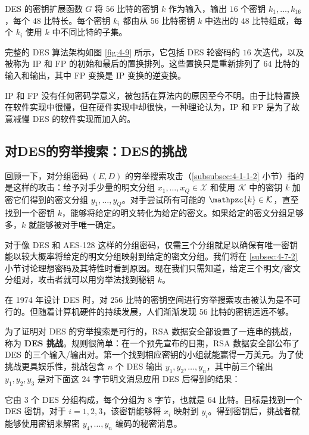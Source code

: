 \begin{snote}[密钥扩展函数。]
DES 的密钥扩展函数 $G$ 将 $56$ 比特的密钥 $k$ 作为输入，输出 $16$ 个密钥 $k_1,\dots,k_{16}$，每个 $48$ 比特长。每个密钥 $k_i$ 都由从 $56$ 比特密钥 $k$ 中选出的 $48$ 比特组成，每个 $k_i$ 使用 $k$ 中不同比特的子集。
\end{snote}

\begin{snote}[DES 算法。]
完整的 DES 算法架构如图 \ref{fig:4-9} 所示，它包括 DES 轮密码的 $16$ 次迭代，以及被称为 IP 和 FP 的初始和最后的置换排列。这些置换只是重新排列了 $64$ 比特的输入和输出，其中 FP 变换是 IP 变换的逆变换。

IP 和 FP 没有任何密码学意义，被包括在算法内的原因至今不明。由于比特置换在软件实现中很慢，但在硬件实现中却很快，一种理论认为，IP 和 FP 是为了故意减慢 DES 的软件实现而加入的。
\end{snote}

\subsection{对DES的穷举搜索：DES的挑战}\label{subsec:4-2-2}

回顾一下，对分组密码 $(E,D)$ 的穷举搜索攻击（\ref{subsubsec:4-1-1-2} 小节）指的是这样的攻击：给予对手少量的明文分组 $x_1,\dots,x_Q\in\mathcal{X}$ 和使用 $\mathcal{K}$ 中的密钥 $k$ 加密它们得到的密文分组 $y_1,\dots,y_Q$。对手尝试所有可能的 $\mathpzc{k}\in\mathcal{K}$，直至找到一个密钥 $k$，能够将给定的明文转化为给定的密文。如果给定的密文分组足够多，$k$ 就能够被对手唯一确定。

对于像 DES 和 AES-128 这样的分组密码，仅需三个分组就足以确保有唯一密钥能以较大概率将给定的明文分组映射到给定的密文分组。我们将在 \ref{subsec:4-7-2} 小节讨论理想密码及其特性时看到原因。现在我们只需知道，给定三个明文/密文分组对，攻击者就可以用穷举法找到秘钥 $k$。

在 1974 年设计 DES 时，对 $256$ 比特的密钥空间进行穷举搜索攻击被认为是不可行的。但随着计算机硬件的持续发展，人们渐渐发现 $56$ 比特的密钥远远不够。

为了证明对 DES 的穷举搜索是可行的，RSA 数据安全部设置了一连串的挑战，称为 \textbf{DES 挑战}。规则很简单：在一个预先宣布的日期，RSA 数据安全部公布了 DES 的三个输入/输出对。第一个找到相应密钥的小组就能赢得一万美元。为了使挑战更具娱乐性，挑战包含 $n$ 个 DES 输出 $y_1,y_2,\dots,y_n$，其中前三个输出 $y_1,y_2,y_3$ 是对下面这 $24$ 字节明文消息应用 DES 后得到的结果：

\begin{figure*}[h!]
  \centering
  
\end{figure*}
它由 $3$ 个 DES 分组构成，每个分组为 $8$ 字节，也就是 $64$ 比特。目标是找到一个 DES 密钥，对于 $i=1,2,3$，该密钥能够将 $x_i$ 映射到 $y_i$。得到密钥后，挑战者就能够使用密钥来解密 $y_4,\dots,y_n$ 编码的秘密消息。

